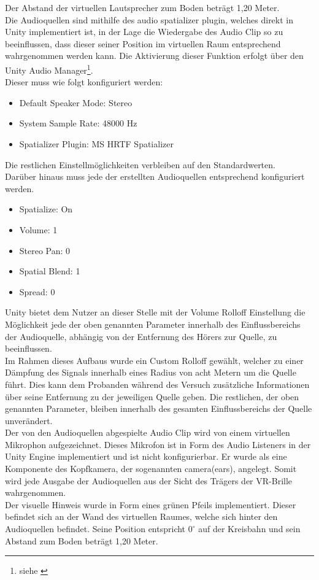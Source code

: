 Der Abstand der virtuellen Lautsprecher zum Boden beträgt 1,20 Meter. \\
Die Audioquellen sind mithilfe des audio spatializer plugin, welches direkt in Unity implementiert ist, in der Lage die Wiedergabe des Audio Clip so zu beeinflussen, dass dieser seiner Position im virtuellen Raum entsprechend wahrgenommen werden kann. Die Aktivierung dieser Funktion erfolgt über den Unity Audio Manager\footnote{siehe \cite{Spatial}}.\\
Dieser muss wie folgt konfiguriert werden:
\begin{itemize}
\item Default Speaker Mode: Stereo
\item System Sample Rate: 48000 Hz
\item Spatializer Plugin: MS HRTF Spatializer
\end{itemize}
Die restlichen Einstellmöglichkeiten verbleiben auf den Standardwerten.\\
Darüber hinaus muss jede der erstellten Audioquellen entsprechend konfiguriert werden.
\begin{itemize}
\item Spatialize: On
\item Volume: 1
\item Stereo Pan: 0
\item Spatial Blend: 1
\item Spread: 0
\end{itemize}
Unity bietet dem Nutzer an dieser Stelle mit der Volume Rolloff Einstellung die Möglichkeit jede der oben genannten Parameter innerhalb des Einflussbereichs der Audioquelle, abhängig von der Entfernung des Hörers zur Quelle, zu beeinflussen.\\
Im Rahmen dieses Aufbaus wurde ein Custom Rolloff gewählt, welcher zu einer Dämpfung des Signals innerhalb eines Radius von acht Metern um die Quelle führt. Dies kann dem Probanden während des Versuch zusätzliche Informationen über seine Entfernung zu der jeweiligen Quelle geben. Die restlichen, der oben genannten Parameter, bleiben innerhalb des gesamten Einflussbereichs der Quelle unverändert.\\
Der von den Audioquellen abgespielte Audio Clip wird von einem virtuellen Mikrophon aufgezeichnet. Dieses Mikrofon ist in Form des Audio Listeners in der Unity Engine implementiert und ist nicht konfigurierbar. Er wurde als eine Komponente des Kopfkamera, der sogenannten camera(ears), angelegt. Somit wird jede Ausgabe der Audioquellen aus der Sicht des Trägers der VR-Brille wahrgenommen.\\
Der visuelle Hinweis wurde in Form eines grünen Pfeils implementiert. Dieser befindet sich an der Wand des virtuellen Raumes, welche sich hinter den Audioquellen befindet. Seine Position entspricht $0^{\circ}$ auf der Kreisbahn und sein Abstand zum Boden beträgt 1,20 Meter.

